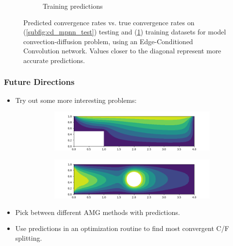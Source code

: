 \documentclass[handout]{beamer}
\begin{document}
\begin{frame}
\begin{figure}[h]
\begin{subfigure}{.48\textwidth}
    \caption{Training predictions}
    \label{subfig:cd_mpnn_train}
  \end{subfigure}
  \caption{Predicted convergence rates vs. true convergence rates on (\ref{subfig:cd_mpnn_test}) testing and (\ref{subfig:cd_mpnn_train}) training datasets for model convection-diffusion problem, using an Edge-Conditioned Convolution network. Values closer to the diagonal represent more accurate predictions.}
  \label{fig:cd_mpnn_pred}
\end{figure}
\end{frame}





\begin{frame}
  \frametitle{Future Directions}
  \begin{itemize}
  \item Try out some more interesting problems:
  \begin{figure}[h]
  \centering
  \begin{subfigure}{.70\textwidth}
    \includegraphics[width=\textwidth]{figures/cd_bfs.png}
  \end{subfigure}
  \begin{subfigure}{.70\textwidth}
    \includegraphics[width=\textwidth]{figures/cd_cyl.png}
  \end{subfigure}
  \end{figure}
  \item Pick between different AMG methods with predictions.
  \item Use predictions in an optimization routine to find most convergent C/F splitting.
  \end{itemize}
\end{frame}
\end{document}
